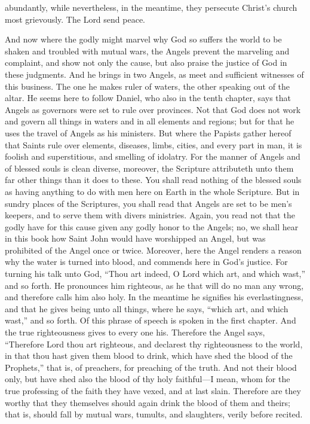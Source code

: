 abundantly, while nevertheless, in the meantime, they persecute Christ’s church most grievously. The Lord send peace.

And now where the godly might marvel why God so suffers the world to be shaken and troubled with mutual wars, the Angels prevent the marveling and complaint, and show not only the cause, but also praise the justice of God in these judgments. And he brings in two Angels, as meet and sufficient witnesses of this business. The one he makes ruler of waters, the other speaking out of the altar. He seems here to follow Daniel, who also in the tenth chapter, says that Angels as governors were set to rule over provinces. Not that God does not work and govern all things in waters and in all elements and regions; but for that he uses the travel of Angels as his ministers. But where the Papists gather hereof that Saints rule over elements, diseases, limbs, cities, and every part in man, it is foolish and superstitious, and smelling of idolatry. For the manner of Angels and of blessed souls is clean diverse, moreover, the Scripture attributeth unto them far other things than it does to these. You shall read nothing of the blessed souls as having anything to do with men here on Earth in the whole Scripture. But in sundry places of the Scriptures, you shall read that Angels are set to be men's keepers, and to serve them with divers ministries. Again, you read not that the godly have for this cause given any godly honor to the Angels; no, we shall hear in this book how Saint John would have worshipped an Angel, but was prohibited of the Angel once or twice. Moreover, here the Angel renders a reason why the water is turned into blood, and commends here in God’s justice. For turning his talk unto God, “Thou art indeed, O Lord which art, and which wast,” and so forth. He pronounces him righteous, as he that will do no man any wrong, and therefore calls him also holy. In the meantime he signifies his everlastingness, and that he gives being unto all things, where he says, “which art, and which wast,” and so forth. Of this phrase of speech is spoken in the first chapter. And the true righteousness gives to every one his. Therefore the Angel says, “Therefore Lord thou art righteous, and declarest thy righteousness to the world, in that thou hast given them blood to drink, which have shed the blood of the Prophets,” that is, of preachers, for preaching of the truth. And not their blood only, but have shed also the blood of thy holy faithful—I mean, whom for the true professing of the faith they have vexed, and at last slain. Therefore are they worthy that they themselves should again drink the blood of them and theirs; that is, should fall by mutual wars, tumults, and slaughters, verily before recited.

